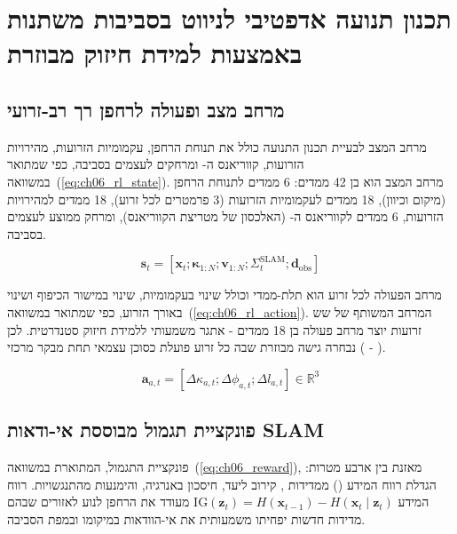 

\section{תכנון תנועה אדפטיבי לניווט בסביבות משתנות באמצעות למידת חיזוק מבוזרת}
\label{sec:ch06_rl_planning}

\subsection{מרחב מצב ופעולה לרחפן רך רב-זרועי}
\label{sec:ch06_state_action}

מרחב המצב לבעיית תכנון התנועה כולל את תנוחת הרחפן, עקמומיות הזרועות, מהירויות הזרועות, קווריאנס ה- ומרחקים לעצמים בסביבה, כפי שמתואר במשוואה~(\ref{eq:ch06_rl_state}). מרחב המצב הוא בן 42 ממדים: 6 ממדים לתנוחת הרחפן (מיקום וכיוון), 18 ממדים לעקמומיות הזרועות (3 פרמטרים לכל זרוע), 18 ממדים למהירויות הזרועות, 6 ממדים לקווריאנס ה- (האלכסון של מטריצת הקווריאנס), ומרחק ממוצע לעצמים בסביבה.

\begin{equation}
\mathbf{s}_t = [\mathbf{x}_t; \boldsymbol{\kappa}_{1:N}; \mathbf{v}_{1:N}; \Sigma_t^{\text{SLAM}}; \mathbf{d}_{\text{obs}}]
\label{eq:ch06_rl_state}
\end{equation}

מרחב הפעולה לכל זרוע הוא תלת-ממדי וכולל שינוי בעקמומיות, שינוי במישור הכיפוף ושינוי באורך הזרוע, כפי שמתואר במשוואה~(\ref{eq:ch06_rl_action}). המרחב המשותף של שש זרועות יוצר מרחב פעולה בן 18 ממדים - אתגר משמעותי ללמידת חיזוק סטנדרטית. לכן נבחרה גישה מבוזרת שבה כל זרוע פועלת כסוכן עצמאי תחת מבקר מרכזי ( - ).

\begin{equation}
\mathbf{a}_{a,t} = [\Delta \kappa_{a,t}; \Delta \phi_{a,t}; \Delta l_{a,t}] \in \mathbb{R}^3
\label{eq:ch06_rl_action}
\end{equation}

\subsection{פונקציית תגמול מבוססת אי-ודאות SLAM}
\label{sec:ch06_reward}

פונקציית התגמול, המתוארת במשוואה~(\ref{eq:ch06_reward}), מאזנת בין ארבע מטרות: הגדלת רווח המידע () ממדידות , קירוב ליעד, חיסכון באנרגיה, והימנעות מהתנגשויות. רווח המידע $\text{IG}(\mathbf{z}_t) = H(\mathbf{x}_{t-1}) - H(\mathbf{x}_t \mid \mathbf{z}_t)$ מעודד את הרחפן לנוע לאזורים שבהם מדידות חדשות יפחיתו משמעותית את אי-הוודאות במיקומו ובמפת הסביבה.

